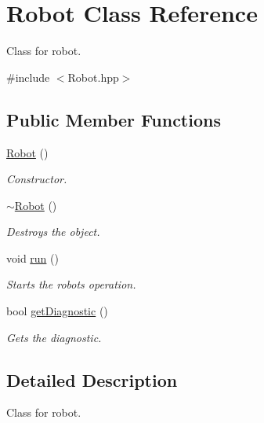 \hypertarget{class_robot}{}\section{Robot Class Reference}
\label{class_robot}


Class for robot.  




{\ttfamily \#include $<$Robot.\+hpp$>$}

\subsection*{Public Member Functions}
\begin{DoxyCompactItemize}
\item 
\hyperlink{class_robot_a4fc7c70ae20623f05e06f2ecb388b6c4}{Robot} ()
\begin{DoxyCompactList}\small\item\em Constructor. \end{DoxyCompactList}\item 
\hyperlink{class_robot_a924320124b09c2f2ac1621aa210d5f38}{$\sim$\+Robot} ()\hypertarget{class_robot_a924320124b09c2f2ac1621aa210d5f38}{}\label{class_robot_a924320124b09c2f2ac1621aa210d5f38}

\begin{DoxyCompactList}\small\item\em Destroys the object. \end{DoxyCompactList}\item 
void \hyperlink{class_robot_a00d8702f14f86ba41d2a8c0d466fab2b}{run} ()\hypertarget{class_robot_a00d8702f14f86ba41d2a8c0d466fab2b}{}\label{class_robot_a00d8702f14f86ba41d2a8c0d466fab2b}

\begin{DoxyCompactList}\small\item\em Starts the robots operation. \end{DoxyCompactList}\item 
bool \hyperlink{class_robot_aba4678da963cd350bc81934182f49262}{get\+Diagnostic} ()
\begin{DoxyCompactList}\small\item\em Gets the diagnostic. \end{DoxyCompactList}\end{DoxyCompactItemize}


\subsection{Detailed Description}
Class for robot. 

